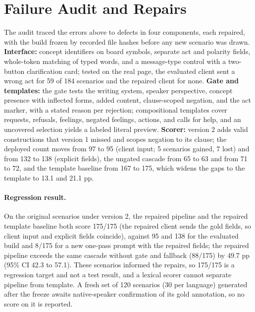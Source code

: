 \section{Failure Audit and Repairs}
\label{sec:repair}

The audit traced the errors above to defects in four components, each repaired, with the build frozen by recorded file hashes before any new scenario was drawn.
\textbf{Interface:} concept identifiers on board symbols, separate act and polarity fields, whole-token matching of typed words, and a message-type control with a two-button clarification card; tested on the real page, the evaluated client sent a wrong act for 59 of 184 scenarios and the repaired client for none.
\textbf{Gate and templates:} the gate tests the writing system, speaker perspective, concept presence with inflected forms, added content, clause-scoped negation, and the act marker, with a stated reason per rejection; compositional templates cover requests, refusals, feelings, negated feelings, actions, and calls for help, and an uncovered selection yields a labeled literal preview.
\textbf{Scorer:} version 2 adds valid constructions that version 1 missed and scopes negation to its clause; the deployed count moves from 97 to 95 (client input; 5 scenarios gained, 7 lost) and from 132 to 138 (explicit fields), the ungated cascade from 65 to 63 and from 71 to 72, and the template baseline from 167 to 175, which widens the gaps to the template to 13.1 and 21.1 pp.

\paragraph{Regression result.}
On the original \NPrimAll{} scenarios under version 2, the repaired pipeline and the repaired template baseline both score 175/175 (the repaired client sends the gold fields, so client input and explicit fields coincide), against 95 and 138 for the evaluated build and 8/175 for a new one-pass prompt with the repaired fields; the repaired pipeline exceeds the same cascade without gate and fallback (88/175) by 49.7 pp (95\% CI 42.3 to 57.1).
These scenarios informed the repairs, so 175/175 is a regression target and not a test result, and a lexical scorer cannot separate pipeline from template.
A fresh set of 120 scenarios (30 per language) generated after the freeze awaits native-speaker confirmation of its gold annotation, so no score on it is reported.

